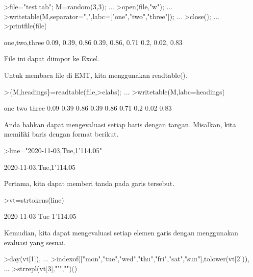 \documentclass[12pt,Times new roman,letterpaper]{book}
\begin{document}
\begin{eulernootebook}
\begin{eulercomment}
\begin{eulercomment}
\begin{eulernootebook}
\begin{eulercomment}
\begin{eulercomment}
\begin{eulercomment}
\begin{eulercomment}
\begin{eulercomment}
\begin{eulercomment}
\begin{eulercomment}
\begin{eulercomment}
\begin{eulercomment}
\begin{eulercomment}
\begin{eulercomment}
\begin{eulercomment}
\begin{eulercomment}
\begin{eulerprompt}
>file="test.tab"; M=random(3,3);  ...
>open(file,"w");  ...
>writetable(M,separator=",",labc=["one","two","three"]);  ...
>close(); ...
>printfile(file)
\end{eulerprompt}
\begin{euleroutput}
  one,two,three
        0.09,      0.39,      0.86
        0.39,      0.86,      0.71
         0.2,      0.02,      0.83
\end{euleroutput}
\begin{eulercomment}
File ini dapat diimpor ke Excel.

Untuk membaca file di EMT, kita menggunakan readtable().
\end{eulercomment}
\begin{eulerprompt}
>\{M,headings\}=readtable(file,>clabs); ...
>writetable(M,labc=headings)
\end{eulerprompt}
\begin{euleroutput}
         one       two     three
        0.09      0.39      0.86
        0.39      0.86      0.71
         0.2      0.02      0.83
\end{euleroutput}
\begin{eulercomment}
Anda bahkan dapat mengevaluasi setiap baris dengan tangan. Misalkan,
kita memiliki baris dengan format berikut.
\end{eulercomment}
\begin{eulerprompt}
>line="2020-11-03,Tue,1'114.05"
\end{eulerprompt}
\begin{euleroutput}
  2020-11-03,Tue,1'114.05
\end{euleroutput}
\begin{eulercomment}
Pertama, kita dapat memberi tanda pada garis tersebut.
\end{eulercomment}
\begin{eulerprompt}
>vt=strtokens(line)
\end{eulerprompt}
\begin{euleroutput}
  2020-11-03
  Tue
  1'114.05
\end{euleroutput}
\begin{eulercomment}
Kemudian, kita dapat mengevaluasi setiap elemen garis dengan
menggunakan evaluasi yang sesuai.
\end{eulercomment}
\begin{eulerprompt}
>day(vt[1]),  ...
>indexof(["mon","tue","wed","thu","fri","sat","sun"],tolower(vt[2])),  ...
>strrepl(vt[3],"'","")()

\end{eulerprompt}
\end{eulercomment}
\end{eulercomment}
\end{eulercomment}
\end{eulercomment}
\end{eulercomment}
\end{eulercomment}
\end{eulercomment}
\end{eulercomment}
\end{eulercomment}
\end{eulercomment}
\end{eulercomment}
\end{eulercomment}
\end{eulercomment}
\end{eulernootebook}
\end{eulercomment}
\end{eulercomment}
\end{eulernootebook}
\end{document}
